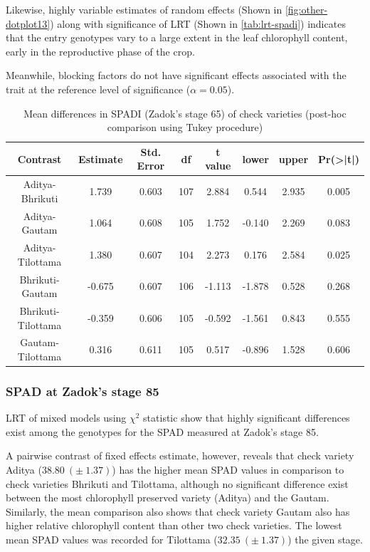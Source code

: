 \documentclass[12pt,oneside]{dukestatscithesis} %
\begin{document}
Likewise, highly variable estimates of random effects (Shown in \ref{fig:other-dotplot13}) along with significance of LRT (Shown in \ref{tab:lrt-spadi}) indicates that the entry genotypes vary to a large extent in the leaf chlorophyll content, early in the reproductive phase of the crop.

Meanwhile, blocking factors do not have significant effects associated with the trait at the reference level of significance (\(\alpha=0.05\)).
\begin{table}[H]

\caption{\label{tab:other-meanconf-tab3}Mean differences in SPADI (Zadok's stage 65) of check varieties (post-hoc comparison using Tukey procedure)}
\centering
\begin{tabular}[t]{cccccccc}
\toprule
Contrast & Estimate & Std. Error & df & t value & lower & upper & Pr(>|t|)\\
\midrule
Aditya-Bhrikuti & 1.739 & 0.603 & 107 & 2.884 & 0.544 & 2.935 & 0.005\\
Aditya-Gautam & 1.064 & 0.608 & 105 & 1.752 & -0.140 & 2.269 & 0.083\\
Aditya-Tilottama & 1.380 & 0.607 & 104 & 2.273 & 0.176 & 2.584 & 0.025\\
Bhrikuti-Gautam & -0.675 & 0.607 & 106 & -1.113 & -1.878 & 0.528 & 0.268\\
Bhrikuti-Tilottama & -0.359 & 0.606 & 105 & -0.592 & -1.561 & 0.843 & 0.555\\
Gautam-Tilottama & 0.316 & 0.611 & 105 & 0.517 & -0.896 & 1.528 & 0.606\\
\bottomrule
\end{tabular}
\end{table}
\hypertarget{spad-at-zadoks-stage-85}{%
\subsubsection{SPAD at Zadok's stage 85}\label{spad-at-zadoks-stage-85}}

LRT of mixed models using \(\chi^2\) statistic show that highly significant differences exist among the genotypes for the SPAD measured at Zadok's stage 85.

A pairwise contrast of fixed effects estimate, however, reveals that check variety Aditya (\(38.80\ (\pm\ 1.37)\)) has the higher mean SPAD values in comparison to check varieties Bhrikuti and Tilottama, although no significant difference exist between the most chlorophyll preserved variety (Aditya) and the Gautam. Similarly, the mean comparison also shows that check variety Gautam also has higher relative chlorophyll content than other two check varieties. The lowest mean SPAD values was recorded for Tilottama (\(32.35\ (\pm\ 1.37)\)) the given stage.
\end{document}
